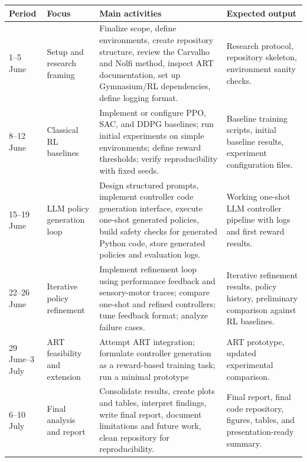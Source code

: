 \documentclass[11pt,a4paper]{article}
\begin{document}
\begin{longtable}{p{2.2cm} p{3.0cm} p{5.2cm} p{4.0cm}}
\toprule
\textbf{Period} & \textbf{Focus} & \textbf{Main activities} & \textbf{Expected output} \\
\midrule
\endhead

1--5 June & Setup and research framing & Finalize scope, define environments, create repository structure, review the Carvalho and Nolfi method, inspect ART documentation, set up Gymnasium/RL dependencies, define logging format. & Research protocol, repository skeleton, environment sanity checks. \\

8--12 June & Classical RL baselines & Implement or configure PPO, SAC, and DDPG baselines; run initial experiments on simple environments; define reward thresholds; verify reproducibility with fixed seeds. & Baseline training scripts, initial baseline results, experiment configuration files. \\

15--19 June & LLM policy generation loop & Design structured prompts, implement controller code generation interface, execute one-shot generated policies, build safety checks for generated Python code, store generated policies and evaluation logs. & Working one-shot LLM controller pipeline with logs and first reward results. \\

22--26 June & Iterative policy refinement & Implement refinement loop using performance feedback and sensory-motor traces; compare one-shot and refined controllers; tune feedback format; analyze failure cases. & Iterative refinement results, policy history, preliminary comparison against RL baselines. \\

29 June--3 July & ART feasibility and extension & Attempt ART integration; formulate controller generation as a reward-based training task; run a minimal prototype & ART prototype, updated experimental comparison. \\

6--10 July & Final analysis and report & Consolidate results, create plots and tables, interpret findings, write final report, document limitations and future work, clean repository for reproducibility. & Final report, final code repository, figures, tables, and presentation-ready summary. \\

\bottomrule
\end{longtable}
\end{document}
